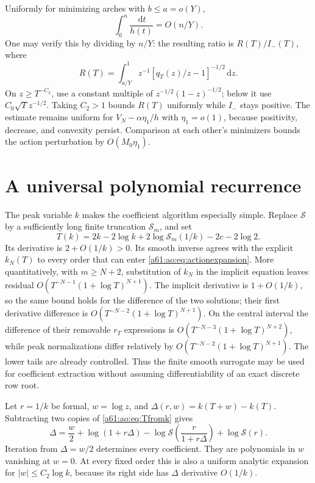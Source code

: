 \documentclass[11pt,letterpaper]{article}
\numberwithin{equation}{section}
\theoremstyle{remark}\newtheorem{remark}[theorem]{Remark}
\newcommand{\Srow}{\mathcal S}
\newcommand{\dd}{\,\mathrm d}
\begin{document}
Uniformly for minimizing arches with $b\le a=o(Y)$,
\[
 \int_0^n\frac{\dd t}{h(t)}=O(n/Y).
\]
One may verify this by dividing by $n/Y$: the resulting ratio is
$R(T)/I_-(T)$, where
\[
 R(T)=\int_{a/Y}^1z^{-1}[q_T(z)/z-1]^{-1/2}\dd z.
\]
On $z\ge T^{-C_2}$, use a constant multiple of
$z^{-1/2}(1-z)^{-1/2}$; below it use
$C_0\sqrt Tz^{-1/2}$. Taking $C_2>1$ bounds $R(T)$ uniformly while
$I_-$ stays positive. The estimate remains uniform for
$V_N-\alpha\eta_1/h$ with $\eta_1=o(1)$, because positivity,
decrease, and convexity persist. Comparison at each other's
minimizers bounds the action perturbation by $O(M_0\eta_1)$.

\section{A universal polynomial recurrence}\label{a61:ao:sec:recurrence}
The peak variable $k$ makes the coefficient algorithm especially
simple. Replace $\Srow$ by a sufficiently long finite truncation
$\Srow_m$, and set
\begin{equation}\label{a61:ao:eq:Tfromk}
 T(k)=2k-2\log k+2\log\Srow_m(1/k)-2c-2\log2.
\end{equation}
Its derivative is $2+O(1/k)>0$. Its smooth inverse agrees with the
explicit $k_N(T)$ to every order that can enter
\eqref{a61:ao:eq:actionexpansion}. More quantitatively, with $m\ge N+2$,
substitution of $k_N$ in the implicit equation leaves residual
$O(T^{-N-1}(1+\log T)^{N+1})$. The implicit derivative is
$1+O(1/k)$, so the same bound holds for the difference of the two
solutions; their first derivative difference is
$O(T^{-N-2}(1+\log T)^{N+1})$. On the central interval the difference
of their removable $r_T$ expressions is
$O(T^{-N-3}(1+\log T)^{N+2})$, while peak normalizations differ
relatively by $O(T^{-N-2}(1+\log T)^{N+1})$. The lower tails are
already controlled. Thus the finite smooth surrogate may be used
for coefficient extraction without assuming differentiability of an
exact discrete row root.

Let $r=1/k$ be formal, $w=\log z$, and
$\Delta(r,w)=k(T+w)-k(T)$. Subtracting two copies of
\eqref{a61:ao:eq:Tfromk} gives
\begin{equation}\label{a61:ao:eq:Deltarecurrence}
 \Delta=\frac w2+\log(1+r\Delta)
 -\log\Srow\left(\frac r{1+r\Delta}\right)+\log\Srow(r).
\end{equation}
Iteration from $\Delta=w/2$ determines every coefficient. They are
polynomials in $w$ vanishing at $w=0$. At every fixed order this is
also a uniform analytic expansion for $|w|\le C_2\log k$, because
its right side has $\Delta$ derivative $O(1/k)$.
\end{document}
